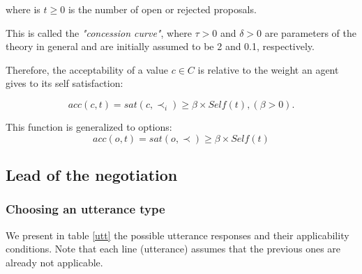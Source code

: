 \documentclass{llncs}
\begin{document}
	
	where is $t \geq 0$ is the number of open or rejected proposals.
	
	This is called the \emph{"concession curve"}, where $\tau > 0$ and $\delta > 0$
	are parameters of the theory in general and are initially assumed to
	be 2 and 0.1, respectively.
	
	Therefore, the acceptability of a value $c \in C$  is relative to the weight an agent gives to its self satisfaction:
	
	\begin{equation}
	acc(c, t) = sat(c, \prec_i) \geq  \beta \times Self(t) ,  (\beta >0).
	\end{equation}
	
	This function is generalized to options:
	\begin{equation}
	acc(o, t) = sat(o, \prec) \geq  \beta \times Self(t)
	\end{equation}
	
	
	
	\subsection{Lead of the negotiation}
	

	\subsubsection{Choosing an utterance type}
	
	
	We present in table \ref{utt} the possible utterance responses and their applicability conditions. Note that each line (utterance) assumes that the previous ones are already not applicable.%
	
\end{document}

